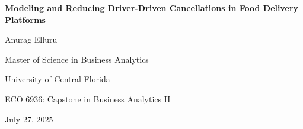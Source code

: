 \documentclass[12pt,letterpaper]{article}
\begin{document}
\begin{titlepage}
    \centering
    \vspace*{2cm}
    {\huge\bfseries Modeling and Reducing Driver-Driven Cancellations in Food Delivery Platforms\par}
    \vspace{2cm}
    {\Large Anurag Elluru\par}
    \vspace{1cm}
    {\large Master of Science in Business Analytics\par}
    {\large University of Central Florida\par}
    \vspace{2cm}
    {\large ECO 6936: Capstone in Business Analytics II\par}
    \vspace{1cm}
    {\large July 27, 2025\par}
\end{titlepage}

\newpage
{}
\setcounter{page}{1}









\printbibliography[heading=bibintoc,title={References}]

\appendix

\end{document}
